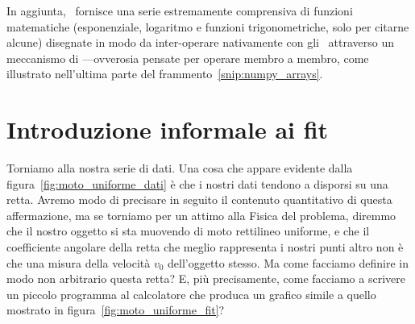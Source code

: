 \begin{snippet}[htb!]
  \bigskip %
\end{snippet}

In aggiunta, \numpy\ fornisce una serie estremamente comprensiva di
funzioni matematiche (esponenziale, logaritmo e funzioni trigonometriche, solo
per citarne alcune) disegnate in modo da inter-operare nativamente con gli
\nparray\ attraverso un meccanismo di ---ovverosia pensate
per operare membro a membro, come illustrato nell'ultima parte del
frammento~\ref{snip:numpy_arrays}.


\section{Introduzione informale ai fit}

Torniamo alla nostra serie di dati. Una cosa che appare evidente dalla
figura~\ref{fig:moto_uniforme_dati} è che i nostri dati tendono a disporsi su
una retta. Avremo modo di precisare in seguito il contenuto quantitativo di
questa affermazione, ma se torniamo per un attimo alla Fisica del problema,
diremmo che il nostro oggetto si sta muovendo di moto rettilineo uniforme, e che
il coefficiente angolare della retta che meglio rappresenta i nostri punti
altro non è che una misura della velocità $v_0$ dell'oggetto stesso.
Ma come facciamo definire in modo non arbitrario questa retta? E, più precisamente,
come facciamo a scrivere un piccolo programma al calcolatore che produca un
grafico simile a quello mostrato in figura~\ref{fig:moto_uniforme_fit}?


